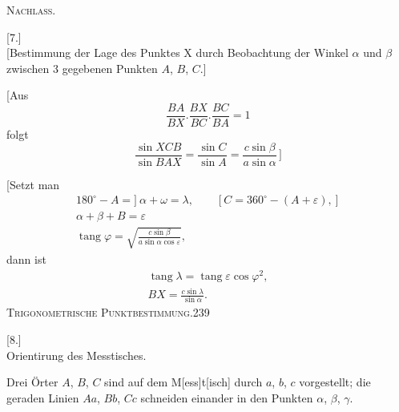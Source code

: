 \clearpage
{}\hfill\textsc{Nachlass.}\hfill\mbox{}\par
\vspace{1.5cm}
\begin{center}{\Large{}}\end{center}
\bigskip
\begin{center}[7.]\\[5pt]
[Bestimmung der Lage des Punktes X durch Beobachtung der Winkel $\alpha$ und $\beta$ zwischen 3 gegebenen Punkten $A$, $B$, $C$.]
\end{center}
[Aus
\[
\frac{BA}{BX}.\frac{BX}{BC}.\frac{BC}{BA}=1
\]
folgt
\[
\frac{\sin XCB}{\sin BAX}=\frac{\sin C}{\sin A}=\frac{c\sin\beta}{a\sin\alpha}\,\bigg]
\]
\begin{center}
\end{center}
[Setzt man
\[
\begin{gathered}
180^\circ-A=]\ \alpha+\omega=\lambda,\qquad [C=360^\circ-(A+\varepsilon),]\\
\alpha+\beta+B=\varepsilon\\[5pt]
\operatorname{tang}\varphi=\sqrt{\frac{c\sin\beta}{a\sin\alpha\cos\varepsilon}},
\end{gathered}
\]
dann ist
\[
\begin{gathered}
\operatorname{tang}\lambda=\operatorname{tang}\varepsilon\cos\varphi^2,\\
BX=\frac{c\sin\lambda}{\sin\alpha}.
\end{gathered}
\]
\clearpage
\noindent\mbox{}\hfill\textsc{Trigonometrische Punktbestimmung.}\hfill239\par\medskip
\begin{center}[8.]\\[5pt]Orientirung des Messtisches.\rlap{\hspace{.12em}\raisebox{1.15ex}{\scriptsize,}}\end{center}
Drei Örter $A$, $B$, $C$ sind auf dem M[ess]t[isch] durch $a$, $b$, $c$ vorgestellt; die geraden Linien $Aa$, $Bb$, $Cc$ schneiden einander in den Punkten $\alpha$, $\beta$, $\gamma$.

